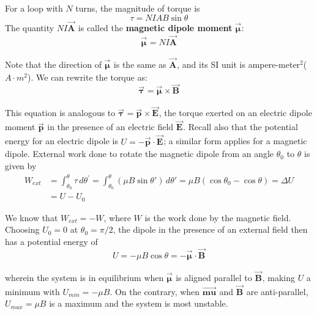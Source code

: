 \documentclass[11pt, letterpaper]{article}
\theoremstyle{definition}
\theoremstyle{remark}
\newcommand{\bv}[2][]{\bm{\vec{#2}_{#1}}}
\begin{document}
For a loop with $N$ turns, the magnitude of torque is \[\tau = NIAB\sin\theta\]
The quantity $NI\bv{A}$ is called the \textbf{magnetic dipole moment} $\bv{\mu}$: 
\begin{equation}\label{eqn: magnetic-dipole-moment}
	\boxed{\bv{\mu} = NI\bv{A}}
\end{equation}

Note that the direction of $\bv{\mu}$ is the same as $\bv{A}$, and its SI unit is ampere-meter$^2$($A\cdot m^2$). We can rewrite the torque as: 
\begin{equation}\label{eqn: torque-dipole}
	\boxed{\bv{\tau} = \bv{\mu} \times \bv{B}}
\end{equation}

This equation is analogous to $\bv{\tau} = \bv{p}\times\bv{E}$, the torque exerted on an electric dipole moment $\bv{p}$ in the presence of an electric field $\bv{E}$. Recall also that the potential energy for an electric dipole is $U = -\bv{p}\cdot\bv{E}$; a similar form applies for a magnetic dipole. External work done to rotate the magnetic dipole from an angle $\theta_0$ to $\theta$ is given by 
\[
\begin{split}
	W_{ext} &= \int_{\theta_0}^{\theta} \tau\, d\theta ^\prime = \int_{\theta_0}^{\theta} (\mu B\sin\theta\prime)\, d\theta\prime = \mu B(\cos\theta_0 - \cos\theta) = \Delta U\\
				&= U - U_0
\end{split}
\]

We know that $W_{ext} = -W$, where $W$ is the work done by the magnetic field. Choosing $U_0 = 0$ at $\theta_0=\pi/2$, the dipole in the presence of an external field then has a potential energy of 
\begin{equation}\label{eqn:magnetic-dipole-energy}
	\boxed{U = -\mu B \cos\theta = -\bv{\mu}\cdot\bv{B}}
\end{equation}

wherein the system is in equilibrium when $\bv{\mu}$ is aligned parallel to $\bv{B}$, making $U$ a minimum with $U_{min} = -\mu B$. On the contrary, when $\bv{mu}$ and $\bv{B}$ are anti-parallel, $U_{max} = \mu B$ is a maximum and the system is most unstable.
\end{document}
